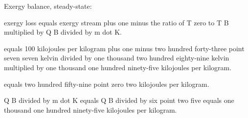 Exergy balance, steady-state:  

exergy loss equals exergy stream plus one minus the ratio of T zero to T B multiplied by Q B divided by m dot K.  

equals 100 kilojoules per kilogram plus one minus two hundred forty-three point seven seven kelvin divided by one thousand two hundred eighty-nine kelvin multiplied by one thousand one hundred ninety-five kilojoules per kilogram.  

equals two hundred fifty-nine point zero two kilojoules per kilogram.  

Q B divided by m dot K equals Q B divided by six point two five equals one thousand one hundred ninety-five kilojoules per kilogram.